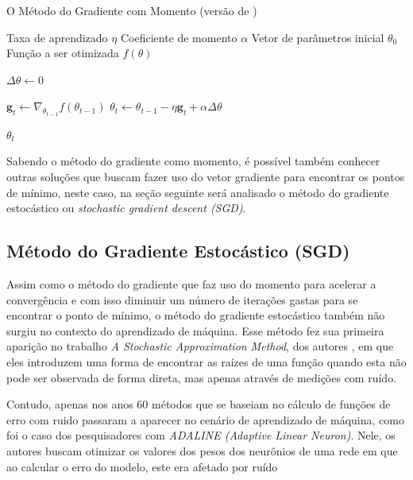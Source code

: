 \begin{algorithm}[H] %
    \caption{O Método do Gradiente com Momento (versão de \parencite{BackpropagationArticle})}
    \label{alg:metodo-do-gradiente-com-momento}
    \begin{algorithmic}[1] %

    \Require Taxa de aprendizado $\eta$
    \Require Coeficiente de momento $\alpha$
    \Require Vetor de parâmetros inicial $\theta_0$
    \Require Função a ser otimizada $f(\theta)$

    \State $\Delta \theta \gets 0$ 

        \State $\textbf{g}_t \leftarrow \nabla_{\theta_{t-1}} f(\theta_{t-1})$
        \State $\theta_t \leftarrow \theta_{t-1} - \eta \textbf{g}_t + \alpha \Delta \theta$
    \EndWhile

    \State \Return $\theta_t$ 
    \end{algorithmic}
\end{algorithm}

Sabendo o método do gradiente como momento, é possível também conhecer outras soluções que buscam fazer uso do vetor gradiente para encontrar os pontos de mínimo, neste caso, na seção seguinte será analisado o método do gradiente estocástico ou \textit{stochastic gradient descent (SGD)}.

\subsection{Método do Gradiente Estocástico (SGD)} 

Assim como o método do gradiente que faz uso do momento para acelerar a convergência e com isso diminuir um número de iterações gastas para se encontrar o ponto de mínimo, o método do gradiente estocástico também não surgiu no contexto do aprendizado de máquina. Esse método fez sua primeira aparição no trabalho \textit{A Stochastic Approximation Method}, dos autores \textcite{StochasticGradientDescentMethod}, em que eles introduzem uma forma de encontrar as raízes de uma função quando esta não pode ser observada de forma direta, mas apenas através de medições com ruído.

Contudo, apenas nos anos 60 métodos que se baseiam no cálculo de funções de erro com ruido passaram a aparecer no cenário de aprendizado de máquina, como foi o caso dos pesquisadores \textcite{Adeline} com \textit{ADALINE (Adaptive Linear Neuron)}. Nele, os autores buscam otimizar os valores dos pesos dos neurônios de uma rede em que ao calcular o erro do modelo, este era afetado por ruído \parencite{Adeline}

